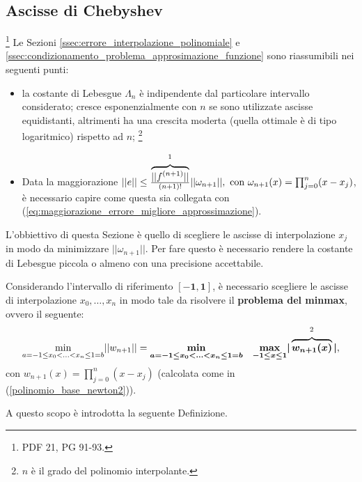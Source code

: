 \subsection{Ascisse di Chebyshev}\label{ssec:ascisse_chebyshev}\footnote{PDF 21, PG 91-93.}
Le Sezioni \ref{ssec:errore_interpolazione_polinomiale} e \ref{ssec:condizionamento_problema_approsimazione_funzione} sono riassumibili nei seguenti punti:
\begin{itemize}
    \item la costante di Lebesgue $\Lambda_n$ è indipendente dal particolare intervallo considerato; cresce esponenzialmente con $n$ se sono utilizzate ascisse equidistanti, altrimenti ha una crescita moderta (quella ottimale è di tipo logaritmico) rispetto ad $n$; \footnote{$n$ è il grado del polinomio interpolante.}
    \item Data la maggiorazione $||e||\leq \frac{\overbrace{||f^{(n+1)}||}^{\footnotemark}}{(n+1)!}||\omega_{n+1}||,\text{ con } \omega_{n+1}(x)=\prod_{j=0}^n(x-x_j)$, è necessario capire come questa sia collegata con (\ref{eq:maggiorazione_errore_migliore_approssimazione}). 
\end{itemize}

L'obbiettivo di questa Sezione è quello di scegliere le ascisse di interpolazione $x_j$ in modo da minimizzare $||\omega_{n+1}||$. Per fare questo è necessario rendere la costante di Lebesgue piccola o almeno con una precisione accettabile.

Considerando l'intervallo di riferimento $\boldsymbol{[-1,1]}$, è necessario scegliere le ascisse di interpolazione $x_0,\hdots,x_n$ in modo tale da risolvere il \textbf{problema del minmax}, ovvero il seguente: \footnotemark
\begin{equation}\label{eq:minmax}
    \underset{a=-1\leq x_0<\hdots<x_n\leq 1=b}{\min}||w_{n+1}||=\boldsymbol{\underset{a=-1\leq x_0<\hdots<x_n\leq 1=b}{\min}\quad\underset{-1\leq x\leq 1}{\max}|}\overbrace{\boldsymbol{w_{n+1}(x)}}^{\footnotemark}\boldsymbol|,
\end{equation}
con $w_{n+1}(x)=\prod_{j=0}^n(x-x_j)$ (calcolata come in (\ref{polinomio_base_newton2})).
\addtocounter{footnote}{-1}


A questo scopo è introdotta la seguente Definizione.

